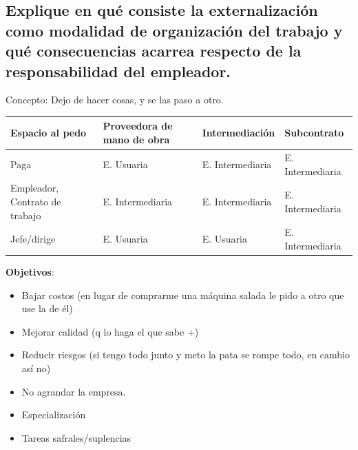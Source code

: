 \documentclass[spanish,12pt,a4paper,titlepage]{report}
\begin{document}
\subsection{Explique en qué consiste la externalización como modalidad de organización del trabajo y qué consecuencias acarrea respecto de la responsabilidad del empleador.}

Concepto: Dejo de hacer cosas, y se las paso a otro.

\begin{tabular}{|p{5cm}||p{3cm}|p{3cm}|p{3cm}|}
  \hline
  Espacio al pedo & Proveedora de mano de obra & Intermediación & Subcontrato \\
  \hline
  \hline
  Paga & E. Usuaria & E. Intermediaria & E. Intermediaria \\
  \hline
  Empleador, Contrato de trabajo &  E. Intermediaria & E. Intermediaria & E. Intermediaria \\
  \hline
  Jefe/dirige & E. Usuaria & E. Usuaria & E. Intermediaria \\
  \hline
\end{tabular}
\newline \newline

\textbf{Objetivos}:
\begin{itemize}
\item Bajar costos (en lugar de comprarme una máquina salada le pido a otro que use la de él)
\item Mejorar calidad (q lo haga el que sabe +)
\item Reducir riesgos (si tengo todo junto y meto la pata se rompe todo, en cambio así no)
\item No agrandar la empresa.
\item Especialización
\item Tareas safrales/suplencias
\end{itemize}
\end{document}
